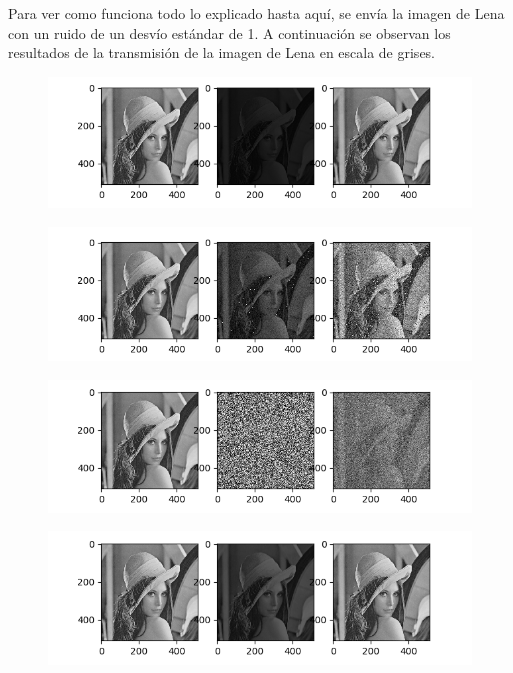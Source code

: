 Para ver como funciona todo lo explicado hasta aqu\'i, se env\'ia la imagen de Lena con un ruido de un desv\'io est\'andar de 1. A continuaci\'on se observan los resultados de la transmisi\'on de la imagen de Lena en escala de grises.
 

\begin{figure}[H]
	\includegraphics[scale=1]{Imagenes/E32S01}
	\centering
\end{figure}
 
\begin{figure}[H]
	\includegraphics[scale=1]{Imagenes/E32S10}
	\centering
\end{figure}

\begin{figure}[H]
\includegraphics[scale=1]{Imagenes/E32S100}
\centering
\end{figure}

\begin{figure}[H]
\includegraphics[scale=1]{Imagenes/E1024S01}
\centering
\end{figure}

